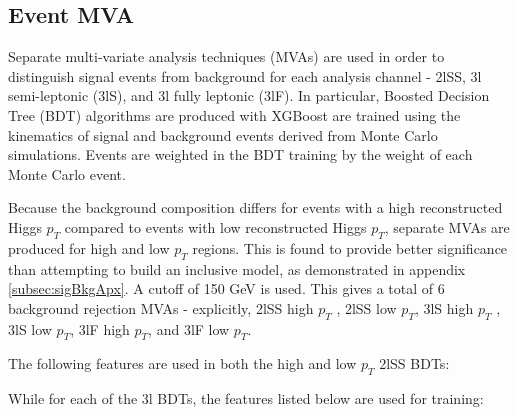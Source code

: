 
\subsection{Event MVA}
\label{subsec:sigBkgMVA}

Separate multi-variate analysis techniques (MVAs) are used in order to distinguish signal events from background for each analysis channel - 2lSS, 3l semi-leptonic (3lS), and 3l fully leptonic (3lF). In particular, Boosted Decision Tree (BDT) algorithms are produced with XGBoost \cite{xgboost} are trained using the kinematics of signal and background events derived from Monte Carlo simulations. Events are weighted in the BDT training by the weight of each Monte Carlo event. 

Because the background composition differs for events with a high reconstructed Higgs $p_T$ compared to events with low reconstructed Higgs $p_T$, separate MVAs are produced for high and low $p_T$ regions. This is found to provide better significance than attempting to build an inclusive model, as demonstrated in appendix \ref{subsec:sigBkgApx}. A cutoff of 150 GeV is used. This gives a total of 6 background rejection MVAs - explicitly, 2lSS high $p_T$ , 2lSS low $p_T$, 3lS high $p_T$ , 3lS low $p_T$, 3lF high $p_T$, and 3lF low $p_T$.

The following features are used in both the high and low $p_T$ 2lSS BDTs:



While for each of the 3l BDTs, the features listed below are used for training:



